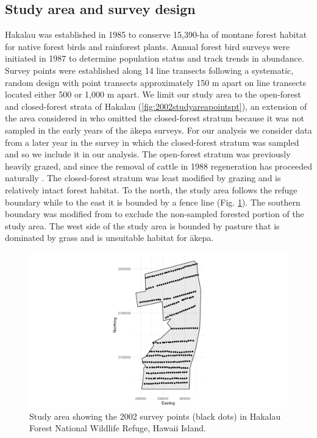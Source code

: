 \documentclass[preprint,12pt]{elsarticle}
\newcommand{\akepa}{\textquotesingle\={a}kepa}  %
\newcommand{\hawaii}{Hawai\textquotesingle i}   %
\begin{document}
\subsection{Study area and survey design}

Hakalau was established in 1985 to conserve 15,390-ha of montane forest habitat for native forest birds and rainforest plants. Annual forest bird surveys were initiated in 1987 to determine population status and track trends in abundance. Survey points were established along 14 line transects following a systematic, random design with point transects approximately 150 m apart on line transects located either 500 or 1,000 m apart. We limit our study area to the open-forest and closed-forest strata of Hakalau (\autoref{fig:2002studyareapointspt}), an extension of the area considered in \cite{camp_population_2010, camp_statespace_2016} who omitted the closed-forest stratum because it was not sampled in the early years of the \akepa{} surveys.  For our analysis we consider data from a later year in the survey in which the closed-forest stratum was sampled and so we include it in our analysis.  The open-forest stratum was previously heavily grazed, and since the removal of cattle in 1988 regeneration has proceeded naturally \citep{maxfield_hakalau_1998}. The closed-forest stratum was least modified by grazing and is relatively intact forest habitat.  To the north, the study area follows the refuge boundary while to the east it is bounded by a fence line (Fig. \ref{fig:2002studyareapointspt}). The southern boundary was modified from \cite{camp_population_2010} to exclude the non-sampled forested portion of the study area. The west side of the study area is bounded by pasture that is dominated by grass and is unsuitable habitat for \akepa.

\begin{figure}
	\centering
	\includegraphics[scale=0.5]{figures/study_area_design.png}
	\caption{Study area showing the 2002 survey points (black dots) in Hakalau Forest National Wildlife Refuge, \hawaii{} Island.}
	\label{fig:2002studyareapointspt}
\end{figure}
\end{document}
